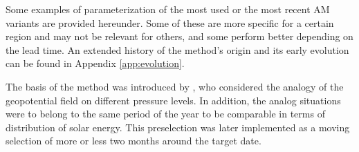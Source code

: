 \documentclass[review]{elsarticle}
\begin{document}






Some examples of parameterization of the most used or the most recent AM variants are provided hereunder. Some of these are more specific for a certain region and may not be relevant for others, and some perform better depending on the lead time. An extended history of the method's origin and its early evolution can be found in Appendix \ref{app:evolution}.

The basis of the method was introduced by \citet{Lorenz1969}, who considered the analogy of the geopotential field on different pressure levels. In addition, the analog situations were to belong to the same period of the year to be comparable in terms of distribution of solar energy. This preselection was later implemented as a moving selection of more or less two months around the target date.
\end{document}
